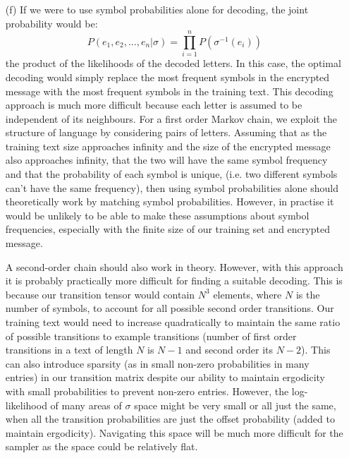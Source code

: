 \documentclass[12pt]{article}
\begin{document}
\begin{enumerate}
\item[(f)] If we were to use symbol probabilities alone for decoding, the joint probability would be:
$$P(e_1, e_2,...,e_n|\sigma) = \prod_{i=1}^n P(\sigma^{-1}(e_i))$$
the product of the likelihoods of the decoded letters. In this case, the optimal decoding would simply replace the most frequent symbols in the encrypted message with the most frequent symbols in the training text. This decoding approach is much more difficult because each letter is assumed to be independent of its neighbours. For a first order Markov chain, we exploit the structure of language by considering pairs of letters. Assuming that as the training text size approaches infinity and the size of the encrypted message also approaches infinity, that the two will have the same symbol frequency and that the probability of each symbol is unique, (i.e. two different symbols can't have the same frequency), then using symbol probabilities alone should theoretically work by matching symbol probabilities. However, in practise it would be unlikely to be able to make these assumptions about symbol frequencies, especially with the finite size of our training set and encrypted message.

A second-order chain should also work in theory. However, with this approach it is probably practically more difficult for finding a suitable decoding. This is because our transition tensor would contain $N^3$ elements, where $N$ is the number of symbols, to account for all possible second order transitions. Our training text would need to increase quadratically to maintain the same ratio of possible transitions to example transitions (number of first order transitions in a text of length $N$ is $N-1$ and second order its $N-2$). This can also introduce sparsity (as in small non-zero probabilities in many entries) in our transition matrix despite our ability to maintain ergodicity with small probabilities to prevent non-zero entries. However, the log-likelihood of many areas of $\sigma$ space might be very small or all just the same, when all the transition probabilities are just the offset probability (added to maintain ergodicity). Navigating this space will be much more difficult for the sampler as the space could be relatively flat.


\end{enumerate}
\end{document}
